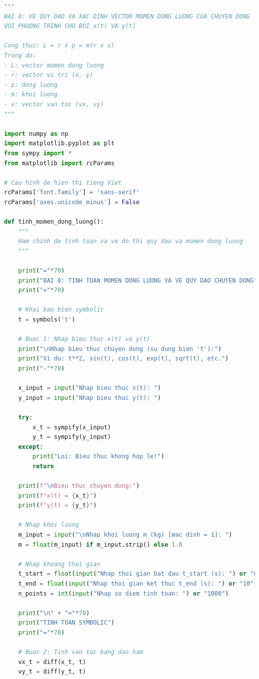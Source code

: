 \documentclass{report}
\begin{document}
\begin{lstlisting}[language=Python, caption={Chương trình tính toán mômen động lượng}, label={code:main}]
"""
BAI 8: VE QUY DAO VA XAC DINH VECTOR MOMEN DONG LUONG CUA CHUYEN DONG
VOI PHUONG TRINH CHO BOI x(t) VA y(t)

Cong thuc: L = r x p = m(r x v)
Trong do:
- L: vector momen dong luong
- r: vector vi tri (x, y)
- p: dong luong
- m: khoi luong
- v: vector van toc (vx, vy)
"""

import numpy as np
import matplotlib.pyplot as plt
from sympy import *
from matplotlib import rcParams

# Cau hinh de hien thi tieng Viet
rcParams['font.family'] = 'sans-serif'
rcParams['axes.unicode_minus'] = False

def tinh_momen_dong_luong():
    """
    Ham chinh de tinh toan va ve do thi quy dao va momen dong luong
    """
    
    print("="*70)
    print("BAI 8: TINH TOAN MOMEN DONG LUONG VA VE QUY DAO CHUYEN DONG")
    print("="*70)
    
    # Khai bao bien symbolic
    t = symbols('t')
    
    # Buoc 1: Nhap bieu thuc x(t) va y(t)
    print("\nNhap bieu thuc chuyen dong (su dung bien 't'):")
    print("Vi du: t**2, sin(t), cos(t), exp(t), sqrt(t), etc.")
    print("-"*70)
    
    x_input = input("Nhap bieu thuc x(t): ")
    y_input = input("Nhap bieu thuc y(t): ")
    
    try:
        x_t = sympify(x_input)
        y_t = sympify(y_input)
    except:
        print("Loi: Bieu thuc khong hop le!")
        return
    
    print(f"\nBieu thuc chuyen dong:")
    print(f"x(t) = {x_t}")
    print(f"y(t) = {y_t}")
    
    # Nhap khoi luong
    m_input = input("\nNhap khoi luong m (kg) [mac dinh = 1]: ")
    m = float(m_input) if m_input.strip() else 1.0
    
    # Nhap khoang thoi gian
    t_start = float(input("Nhap thoi gian bat dau t_start (s): ") or "0")
    t_end = float(input("Nhap thoi gian ket thuc t_end (s): ") or "10")
    n_points = int(input("Nhap so diem tinh toan: ") or "1000")
    
    print("\n" + "="*70)
    print("TINH TOAN SYMBOLIC")
    print("="*70)
    
    # Buoc 2: Tinh van toc bang dao ham
    vx_t = diff(x_t, t)
    vy_t = diff(y_t, t)
    

\end{lstlisting}
\end{document}
